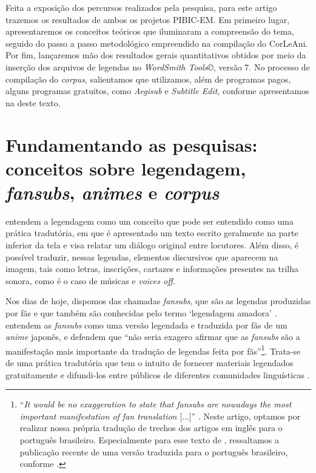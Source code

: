 \documentclass[portuguese]{textolivre}
\begin{document}
Feita a exposição dos percursos realizados pela pesquisa, para este artigo trazemos os resultados de ambos os projetos PIBIC-EM. Em primeiro lugar, apresentaremos os conceitos teóricos que iluminaram a compreensão do tema, seguido do passo a passo metodológico empreendido na compilação do CorLeAni. Por fim, lançaremos mão dos resultados gerais quantitativos obtidos por meio da inserção dos arquivos de legendas no \textit{WordSmith Tools©}, versão 7. No processo de compilação do \textit{corpus}, salientamos que utilizamos, além de programas pagos, alguns programas gratuitos, como \textit{Aegisub} e \textit{Subtitle Edit}, conforme apresentamos na  deste texto.

\section{Fundamentando as pesquisas: conceitos sobre legendagem, \textit{fansubs}, \textit{animes} e \textit{corpus}}\label{sec-normas}
\textcite{diaz-cintas_audiovisual_2007} entendem a legendagem como um conceito que pode ser entendido como uma prática tradutória, em que é apresentado um texto escrito geralmente na parte inferior da tela e visa relatar um diálogo original entre locutores. Além disso, é possível traduzir, nessas legendas, elementos discursivos que aparecem na imagem, tais como letras, inscrições, cartazes e informações presentes na trilha sonora, como é o caso de músicas e \textit{voices off}.

Nos dias de hoje, dispomos das chamadas \textit{fansubs}, que são as legendas produzidas por fãs e que também são conhecidas pelo termo ‘legendagem amadora’ \cite{bogucki_amateur_2009}. \textcite[p. 1]{diaz-cintas_fansubs:_2006} entendem as \textit{fansubs} como uma versão legendada e traduzida por fãs de um \textit{anime} japonês, e defendem que “não seria exagero afirmar que as \textit{fansubs} são a manifestação mais importante da tradução de legendas feita por fãs”\footnote{“\textit{It would be no exaggeration to state that fansubs are nowadays the most important manifestation of fan translation} [...]” \cite[p. 1, tradução nossa]{diaz-cintas_fansubs:_2006}. Neste artigo, optamos por realizar nossa própria tradução de trechos dos artigos em inglês para o português brasileiro. Especialmente para esse texto de \textcite{diaz-cintas_fansubs:_2006}, ressaltamos a publicação recente de uma versão traduzida para o português brasileiro, conforme \textcite{diaz_cintas_fansubs:_2022}.}. Trata-se de uma prática tradutória que tem o intuito de fornecer materiais legendados gratuitamente e difundi-los entre públicos de diferentes comunidades linguísticas \cite{bogucki_amateur_2009}.
\end{document}
